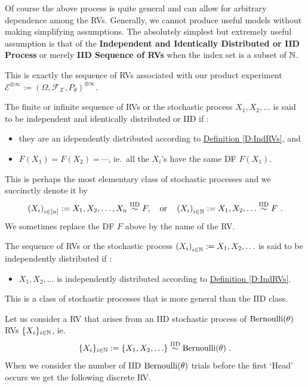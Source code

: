 Of course the above process is quite general and can allow for arbitrary dependence among the RVs.  
Generally, we cannot produce useful models without making simplifying assumptions. 
The absolutely simplest but extremely useful assumption is that of the {\bf Independent and Identically Distributed or IID Process} or merely {\bf IID Sequence of RVs} when the index set is a subset of $\mathbb{N}$. 

This is exactly the sequence of RVs associated with our product experiment $\mathcal{E}^{\otimes \infty} := (\Omega, \mathcal{F}_{\mathcal{X}}, P_{\theta})^{\otimes \infty}$.
    
\begin{definition}
The finite or infinite sequence of RVs or the stochastic process $X_1, X_2,\ldots$ is said to be independent and identically distributed or IID if :
\begin{itemize}
\item they are an idependently distributed according to \hyperref[D:IndRVs]{Definition \ref*{D:IndRVs}}, and
\item $F(X_1) = F(X_2) = \cdots $, ie.~all the $X_i$'s have the same DF $F(X_1)$.
\end{itemize}
This is perhaps the most elementary class of stochastic processes and we succinctly denote it by
\[
\left(X_i\right)_{i \in [n]} := X_1, X_2,\ldots, X_n \overset{{\rm IID}}{\sim} F, \quad \text{or} \quad \left(X_i\right)_{i \in \mathbb{N}} := X_1, X_2,\ldots  \overset{{\rm IID}}{\sim} F \ .
\]
We sometimes replace the DF $F$ above by the name of the RV.
 \end{definition}
 
\begin{definition}
The sequence of RVs or the stochastic process $\left(X_i\right)_{i \in \mathbb{N}} := X_1, X_2,\ldots$ is said to be independently distributed if :
\begin{itemize}
\item $X_1, X_2,\ldots$ is independently distributed according to \hyperref[D:IndRVs]{Definition \ref*{D:IndRVs}}.
\end{itemize}
This is a class of stochastic processes that is more general than the IID class.
\end{definition}

Let us consider a RV that arises from an IID stochastic process of $\mbox{{\rm Bernoulli}}(\theta)$ RVs $\{X_i\}_{i \in \mathbb{N}}$, ie.~
\[
 \{X_i\}_{i \in \mathbb{N}} := \{X_1, X_2,\ldots\}  \overset{{\rm IID}}{\sim} \mbox{{\rm Bernoulli}}(\theta) \ .
\]
When we consider the number of IID $\mbox{{\rm Bernoulli}}(\theta)$ trials before the first `Head' occurs we get the following discrete RV.

